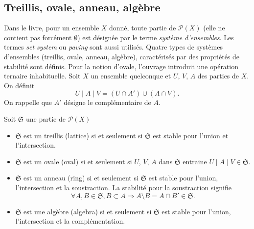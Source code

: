 \subsection{Treillis, ovale, anneau, algèbre}
Dans le livre, pour un ensemble $X$ donné, toute partie de $\mathcal{P}(X)$ (elle ne contient pas forcément $\emptyset$) est désignée par le terme \emph{système d'ensembles}. Les termes \emph{set system} ou \emph{paving} sont aussi utilisés. Quatre types de systèmes d'ensembles (treillis, ovale, anneau, algèbre), caractérisés par des propriétés de stabilité sont définis. Pour la notion d'ovale, l'ouvrage introduit une opération ternaire inhabituelle.\newline
Soit $X$ un ensemble quelconque et $U$, $V$, $A$ des parties de $X$. On définit
\begin{displaymath}
  U \mid A \mid V = (U \cap A') \cup ( A \cap V).
\end{displaymath}
On rappelle que $A'$ désigne le complémentaire de $A$.
\begin{defin}
  Soit $\mathfrak{S}$ une partie de $\mathcal{P}(X)$
  \begin{itemize}
    \item $\mathfrak{S}$ est un treillis (lattice) si et seulement si $\mathfrak{S}$ est stable pour l'union et l'intersection.
    \item $\mathfrak{S}$ est un ovale (oval) si et seulement si $U$, $V$, $A$ dans $\mathfrak{S}$ entraine $U \mid A \mid V \in \mathfrak{S}$.
    \item $\mathfrak{S}$ est un anneau (ring) si et seulement si $\mathfrak{S}$ est stable pour l'union, l'intersection et la soustraction. La stabilité pour la soustraction signifie
    \begin{displaymath}
      \forall A, B \in \mathfrak{S}, B \subset A \Rightarrow A \setminus B = A \cap B' \in \mathfrak{S}.
    \end{displaymath}  
    \item $\mathfrak{S}$ est une algèbre (algebra) si et seulement si $\mathfrak{S}$ est stable pour l'union, l'intersection et la complémentation. 
  \end{itemize}
\end{defin}

